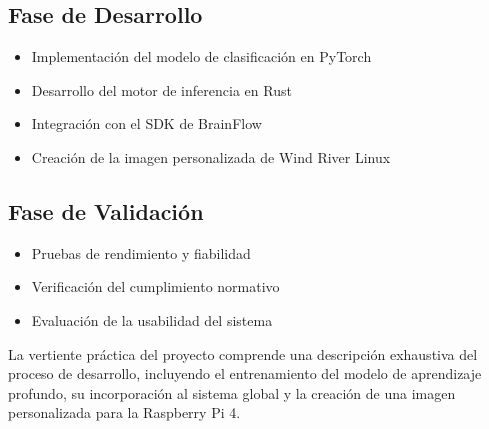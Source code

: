 \subsection{Fase de Desarrollo}
\begin{itemize}
    \item Implementación del modelo de clasificación en PyTorch
    \item Desarrollo del motor de inferencia en Rust
    \item Integración con el SDK de BrainFlow
    \item Creación de la imagen personalizada de Wind River Linux
\end{itemize}

\subsection{Fase de Validación}
\begin{itemize}
    \item Pruebas de rendimiento y fiabilidad
    \item Verificación del cumplimiento normativo
    \item Evaluación de la usabilidad del sistema
\end{itemize}

La vertiente práctica del proyecto comprende una descripción exhaustiva del proceso de desarrollo, incluyendo el entrenamiento del modelo de aprendizaje profundo, su incorporación al sistema global y la creación de una imagen personalizada para la Raspberry Pi 4.